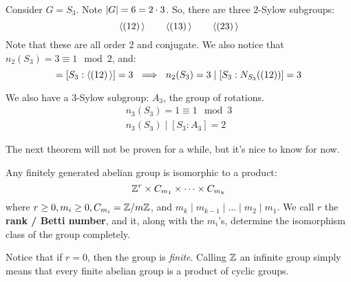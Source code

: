\begin{xmp}[source=Primary Source Material]
    Consider $ G = S_{3} $. Note $ \abs{G} = 6 = 2 \cdot 3 $.
    So, there are three $ 2 $-Sylow subgroups:
    \begin{equation*}
        \operatorname{\langle} (12) \operatorname{\rangle} \qquad \operatorname{\langle} (13) \operatorname{\rangle} \qquad \operatorname{\langle} (23) \operatorname{\rangle}
    \end{equation*}
    Note that these are all order $ 2 $ and conjugate.
    We also notice that $ n_{2}(S_{3}) = 3 \equiv 1 \mod 2 $, and:
    \begin{equation*}
        [S_{3}:N_{S_{3}}((12))] = [S_{3}:\la (12) \ra] = 3 \ \implies \ n_{2}(S_{3}) = 3
        \mid [S_{3}:N_{S_{3}}((12))] = 3
    \end{equation*}

    We also have a $ 3 $-Sylow subgroup: $ A_{3} $, the group of rotations.
    \begin{gather*}
        n_{3}(S_{3}) = 1 \equiv 1 \mod 3 \\
        n_{3}(S_{3}) \mid [S_{3}:A_{3}] = 2
    \end{gather*}
\end{xmp}

The next theorem will not be proven for a while, but it's nice to know for now.

\begin{thm}[title=Fundamental Theorem of Finitely Generated Abelian Groups]
    Any finitely generated abelian group is isomorphic to a product:
    \begin{equation*}
        \mathbb{Z}^{r} \times C_{m_{1}} \times \dots \times C_{m_{k}}
    \end{equation*}
    where $ r \geq 0, m_{i} \geq 0, C_{m_{i}} = \mathbb{Z}/m\mathbb{Z} $, and
    $ m_{k} \mid m_{k-1} \mid \dots \mid m_{2} \mid m_{1} $. \vsp
    We call $ r $ the \textbf{rank / Betti number}, and it, along with the $ m_{i} $'s,
    determine the isomorphism class of the group completely.
\end{thm}

Notice that if $ r = 0 $, then the group is \textit{finite}.
Calling $ \mathbb{Z} $ an infinite group simply means that every finite abelian group is a
product of cyclic groups.

